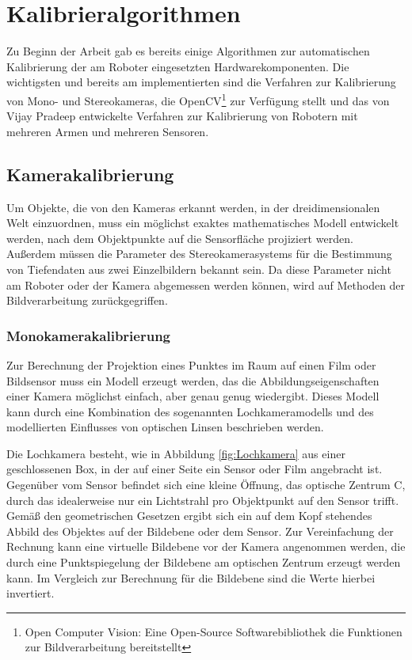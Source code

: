 
\section{Kalibrieralgorithmen} %

\label{sub:Kalibrieralgorithmen}


Zu
Beginn der Arbeit gab es bereits einige Algorithmen zur automatischen
Kalibrierung der am Roboter eingesetzten Hardwarekomponenten. Die wichtigsten
und bereits am \cob implementierten sind die Verfahren zur Kalibrierung von
Mono- und Stereokameras, die OpenCV\footnote{Open Computer Vision: Eine 
Open-Source Softwarebibliothek die Funktionen zur Bildverarbeitung bereitstellt}
zur Verfügung stellt und das von Vijay
Pradeep entwickelte Verfahren zur Kalibrierung von Robotern mit mehreren Armen
und mehreren Sensoren.\cite{Pradeep2010}


\subsection{Kamerakalibrierung} %

\label{sub:Kamerakalibrierung}


Um
Objekte, die von den Kameras erkannt werden, in der dreidimensionalen Welt
einzuordnen, muss ein möglichst exaktes mathematisches Modell entwickelt werden,
nach dem Objektpunkte auf die Sensorfläche projiziert werden. Außerdem müssen
die Parameter des Stereokamerasystems für die Bestimmung von Tiefendaten aus
zwei Einzelbildern bekannt sein. Da diese Parameter nicht am
Roboter oder der Kamera abgemessen werden können, wird auf Methoden der
Bildverarbeitung zurückgegriffen.

\subsubsection{Monokamerakalibrierung} %

\label{ssub:Monokamera}


Zur Berechnung der Projektion eines Punktes im Raum auf einen Film oder
Bildsensor muss ein Modell erzeugt werden, das die Abbildungseigenschaften
einer Kamera möglichst einfach, aber genau genug wiedergibt. Dieses Modell kann
durch eine Kombination des sogenannten Lochkameramodells und des modellierten
Einflusses von optischen Linsen beschrieben werden.\cite{Bradski2008}

Die Lochkamera besteht, wie in Abbildung \ref{fig:Lochkamera} aus einer 
geschlossenen Box, in der auf einer Seite ein
Sensor oder Film angebracht ist. Gegenüber vom Sensor befindet sich eine kleine
Öffnung, das optische Zentrum C, durch das idealerweise nur ein Lichtstrahl pro
Objektpunkt auf den Sensor
trifft. Gemäß den geometrischen Gesetzen ergibt sich ein auf dem Kopf stehendes
Abbild des Objektes auf der Bildebene oder dem Sensor. Zur Vereinfachung der
Rechnung kann eine virtuelle Bildebene vor der Kamera angenommen werden, die
durch eine Punktspiegelung der Bildebene am optischen Zentrum erzeugt werden
kann. Im Vergleich zur Berechnung für die Bildebene sind die Werte hierbei
invertiert.\cite{forsyth2011}


